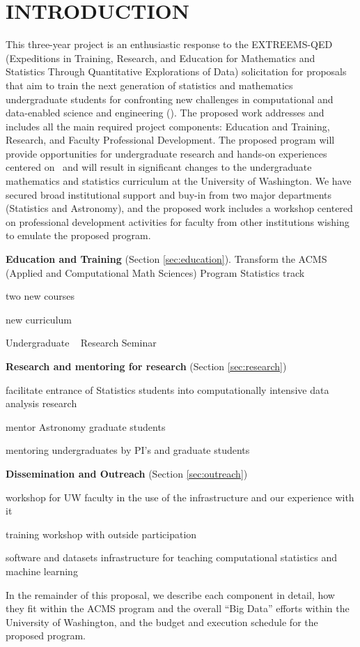 \section{ INTRODUCTION}

This three-year project is an enthusiastic response to the EXTREEMS-QED (Expeditions in Training, Research, 
and Education for Mathematics and Statistics Through Quantitative Explorations of Data) solicitation for proposals
that aim to train the next generation of statistics and mathematics undergraduate students for confronting new
challenges in computational and data-enabled science and engineering (\cdse).  The proposed work addresses and 
includes all the main required project components: Education and Training, Research, and Faculty Professional 
Development. The proposed program will provide opportunities for undergraduate research and hands-on experiences 
centered on \cdse\ and will result in significant changes to the undergraduate mathematics and statistics curriculum 
at the University of Washington. We have secured broad institutional support and buy-in from two major departments 
(Statistics and Astronomy), and the proposed work includes a workshop centered on professional development activities
for faculty from other institutions wishing to emulate the proposed program. 

\bits
\item[]{\bf Education and Training} (Section \ref{sec:education}).
Transform the ACMS (Applied and Computational Math Sciences) Program Statistics track
  \bits
  \item two new courses
  \item new curriculum 
  \item Undergraduate \cdse~ Research Seminar
  \eits
\item {\bf Research and mentoring for research} (Section \ref{sec:research})
  \bits
  \item facilitate entrance of Statistics students into computationally intensive data analysis research
  \item mentor Astronomy graduate students 
  \item mentoring undergraduates by PI's and graduate students
  \eits
\item {\bf Dissemination and Outreach} (Section \ref{sec:outreach})
  \bits
  \item workshop for UW faculty in the use of the infrastructure and our experience with it
  \item training workshop with outside participation 
  \item software and datasets infrastructure for teaching computational statistics and machine learning 
  \eits
\eits  


In the remainder of this proposal, we describe each component in
detail, how they fit within the ACMS program and the overall ``Big
Data'' efforts within the University of Washington, and the budget and
execution schedule for the proposed program.


